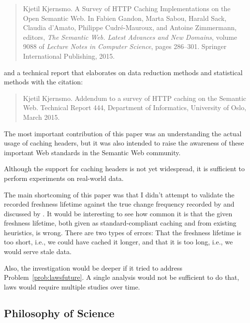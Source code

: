 \begin{quote}
Kjetil Kjernsmo.
\newblock A Survey of HTTP Caching Implementations on the Open Semantic Web.
\Newblock In Fabien Gandon, Marta Sabou, Harald Sack, Claudia d’Amato,
  Philippe Cudré-Mauroux, and Antoine Zimmermann, editors, {\em The Semantic
  Web. Latest Advances and New Domains}, volume 9088 of {\em Lecture Notes in
  Computer Science}, pages 286--301. Springer International Publishing, 2015.
\end{quote}

and a technical report that elaborates on data reduction
methods and statistical methods with the citation:

\begin{quote}
Kjetil Kjernsmo.
\newblock Addendum to a survey of {HTTP} caching on the {Semantic Web}.
\newblock Technical Report 444, Department of Informatics, University of Oslo,
  March 2015.
\end{quote}

The most important contribution of this paper was an understanding the
actual usage of caching headers, but it was also intended to raise the
awareness of these important Web standards in the Semantic Web community.

Although the support for caching headers is not yet widespread, it is
sufficient to perform experiments on real-world data.

The main shortcoming of this paper was that I didn't attempt to
validate the recorded freshness lifetime against the true change
frequency recorded by \cite{dyldo2} and discussed by
\cite{Dividino2015}. It would be interesting to see how common it is
that the given freshness lifetime, both given as standard-compliant
caching and from existing heuristics, is wrong. There are two types of
errors: That the freshness lifetime is too short, i.e., we could have
cached it longer, and that it is too long, i.e., we would serve stale
data.

Also, the investigation would be deeper if it tried to address
Problem~\ref{prob:lawsfuture}. A single analysis would not be
sufficient to do that, laws would require multiple studies over time.

\subsection{Philosophy of Science}\label{sec:conphil}

